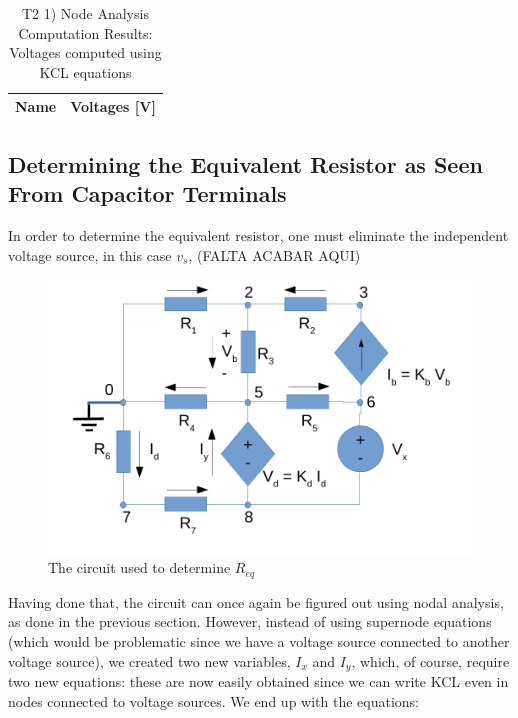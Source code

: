 \begin{table}[ht]
  \centering
  \begin{tabular}{|l|r|}
    \hline    
    {\bf Name} & {\bf Voltages [V]} \\ \hline
    
  \end{tabular}
  \caption{T2 1) Node Analysis Computation Results: Voltages computed using KCL equations}
  \label{tab:nodeVoltages1}
\end{table}


\subsection{Determining the Equivalent Resistor as Seen From Capacitor Terminals}

In order to determine the equivalent resistor, one must eliminate the independent voltage source, in this case $v_s$, (FALTA ACABAR AQUI)

\begin{figure}[h] \centering
\includegraphics[width=0.5\linewidth]{t2-t2.pdf}
\caption{The circuit used to determine $R_{eq}$}
\label{fig3}
\end{figure}

Having done that, the circuit can once again be figured out using nodal analysis, as done in the previous section. However, instead of using supernode equations
(which would be problematic since we have a voltage source connected to another voltage source), we created two new variables, $I_x$ and $I_y$, which, of course,
require two new equations: these are now easily obtained since we can write KCL even in nodes connected to voltage sources. We end up with the equations:

